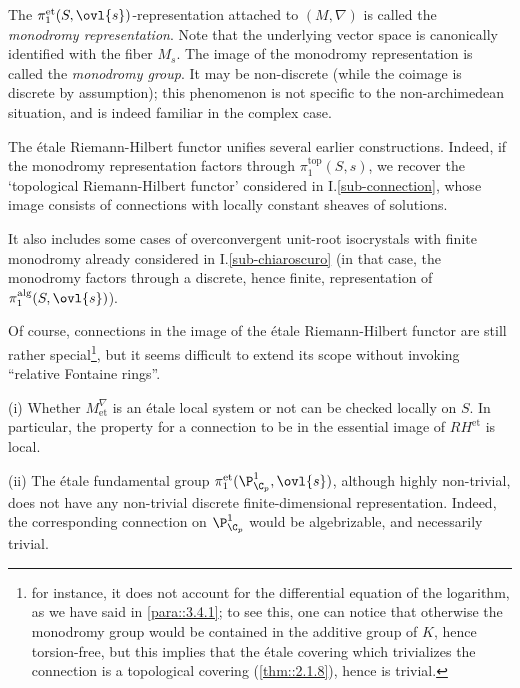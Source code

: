 \begin{para}\label{para::3.4.7} The $ \pi_1^{\mathrm{et}}(S, \ovl{s})
 $-representation attached to $(M,\nabla)$ is called the {\it
mono\-dromy representation}. Note that the underlying vector space is
canonically identified with the fiber $M_s$. The image of the monodromy
representation is called the {\it monodromy group}. It may be
non-discrete (while the coimage is discrete by assumption); this
phenomenon is not specific to the non-archimedean situation, and is
indeed familiar in the complex case.
\end{para}

\begin{para}\label{para::3.4.8} The \'etale Riemann-Hilbert functor unifies
 several earlier constructions. Indeed, if the monodromy representation
 factors through $\pi_1^{\mathrm{top}}(S,s)$, we recover the
 `topological Riemann-Hilbert functor' considered in
 I.\ref{sub-connection}, whose image consists of connections with
 locally constant sheaves of solutions.

\noindent It also includes some cases of overconvergent unit-root
isocrystals with finite monodromy already considered in
I.\ref{sub-chiaroscuro} (in that case, the monodromy factors through a
discrete, hence finite, 
representation of $\pi_1^{\mathrm{alg}}(S, \ovl{s})$).

 Of course, connections in the image of the \'etale Riemann-Hilbert
 functor are still rather special\footnote{for instance, it does not
 account for the differential equation of the logarithm, as we 
 have said in \ref{para::3.4.1}; to see this, one can notice that otherwise the
 monodromy group would be contained in the additive 
 group of $K$, hence torsion-free, but this implies that the \'etale
 covering which trivializes the connection is a 
 topological covering (\ref{thm::2.1.8}), hence is trivial.}, but it
 seems difficult to extend its scope without invoking ``relative
 Fontaine rings''.
\end{para}

\begin{rems}
  (i) Whether $M_{\mathrm{et}}^\nabla$ is an
	\'etale local system or not can be checked locally on $S$. In 
	particular, the property for a connection to be in the essential image
	of $RH^{\mathrm{et}}$ is local. 

  (ii) The \'etale fundamental group $\pi_1^{\mathrm{et}}(\P^1_{\C_p},
	\ovl{s})$, although highly non-trivial, does not have any non-trivial
	discrete finite-dimensional representation. Indeed, 
	the corresponding connection on
	$\P^1_{\C_p}$ would be algebrizable, and necessarily trivial.
\end{rems} 


